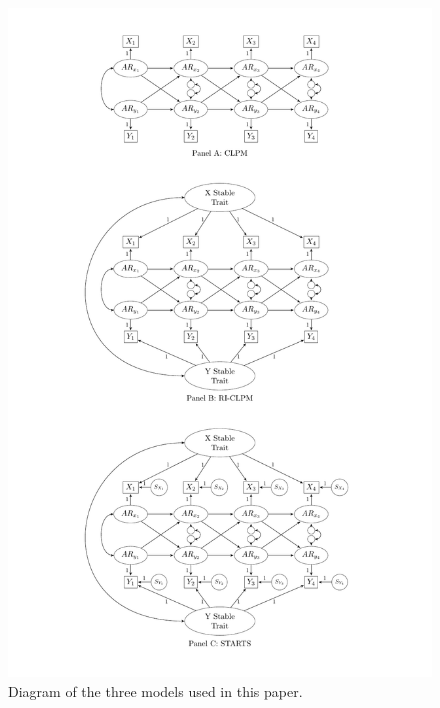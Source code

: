 \documentclass[
  english,
  man,floatsintext]{apa6}
\begin{document}
\begin{figure}
\includegraphics[height=0.9\textheight]{images/comboFigure} \caption{Diagram of the three models used in this paper.}\label{fig:riclpmFig}
\end{figure}
\end{document}
